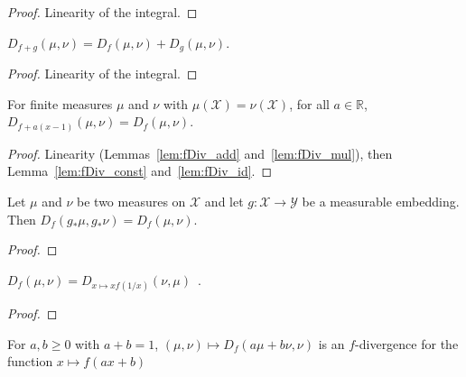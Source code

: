\begin{proof}\leanok
Linearity of the integral.
\end{proof}


\begin{lemma}
  \label{lem:fDiv_add}
  \leanok
  $D_{f + g}(\mu, \nu) = D_f(\mu, \nu) + D_g(\mu, \nu)$.
\end{lemma}

\begin{proof}\leanok
Linearity of the integral.
\end{proof}


\begin{lemma}
  \label{lem:fDiv_add_linear}
  For finite measures $\mu$ and $\nu$ with $\mu(\mathcal X) = \nu(\mathcal X)$, for all $a \in \mathbb{R}$, $D_{f + a(x - 1)}(\mu, \nu) = D_{f}(\mu, \nu)$.
\end{lemma}

\begin{proof}%
{}
Linearity (Lemmas~\ref{lem:fDiv_add} and~\ref{lem:fDiv_mul}), then Lemma~\ref{lem:fDiv_const} and~\ref{lem:fDiv_id}.
\end{proof}


\begin{lemma}
  \label{lem:fDiv_map_measurableEmbedding}
  \leanok
  Let $\mu$ and $\nu$ be two measures on $\mathcal X$ and let $g : \mathcal X \to \mathcal Y$ be a measurable embedding. Then $D_f(g_* \mu, g_* \nu) = D_f(\mu, \nu)$.
\end{lemma}

\begin{proof}\leanok
\end{proof}


\begin{lemma}
  \label{lem:fDiv_symm}
  \leanok
  $D_f(\mu, \nu) = D_{x \mapsto xf(1/x)}(\nu, \mu)$~.
\end{lemma}

\begin{proof}\leanok
\uses{}

\end{proof}


\begin{lemma}
  \label{lem:fDiv_add_smul_left}
  \leanok
  For $a, b \ge 0$ with $a + b = 1$, $(\mu, \nu) \mapsto D_f(a \mu + b \nu, \nu)$ is an $f$-divergence for the function $x \mapsto f(ax + b)$
\end{lemma}

